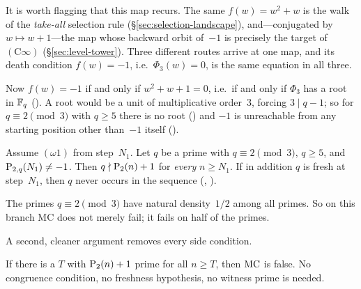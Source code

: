 It is worth flagging that this map recurs.  The same $f(w) = w^2+w$ is the
walk of the \emph{take-all} selection rule (\S\ref{sec:selection-landscape}),
and---conjugated by $w \mapsto w+1$---the map whose backward orbit
of~$-1$ is precisely the target of $(\mathrm{C}\infty)$
(\S\ref{sec:level-tower}).  Three different routes arrive at one map, and
its death condition $f(w) = -1$, i.e.\ $\Phi_3(w) = 0$, is the same
equation in all three.

Now $f(w) = -1$ if and only if $w^2 + w + 1 = 0$, i.e.\ if and only if
$\Phi_3$ has a root in $\mathbb{F}_q$
().
A root would be a unit of multiplicative order~$3$, forcing
$3 \mid q-1$; so for $q \equiv 2 \pmod 3$ with $q \geq 5$ there is no
root () and
$-1$ is unreachable from any starting position other than~$-1$ itself
().

\begin{keyresult}
\begin{theorem}
\label{thm:perpetual-excludes}
Assume $(\omega 1)$ from step~$N_1$.  Let $q$ be a prime with
$q \equiv 2 \pmod 3$, $q \geq 5$, and $\mathrm{P}_{2,q}(N_1) \neq -1$.
Then $q \nmid \mathrm{P}_{2}(n)+1$ for \emph{every} $n \geq N_1$.  If in
addition $q$ is fresh at step~$N_1$, then $q$ never occurs in the
sequence
(,
).
\end{theorem}
\end{keyresult}

\noindent
The primes $q \equiv 2 \pmod 3$ have natural density~$1/2$ among all
primes.  So on this branch MC does not merely fail; it fails on half
of the primes.

A second, cleaner argument removes every side condition.

\begin{keyresult}
\begin{theorem}
\label{thm:bertrand-route}
If there is a $T$ with $\mathrm{P}_{2}(n)+1$ prime for all $n \geq T$, then
$\mathrm{MC}$ is false.  No congruence condition, no freshness hypothesis, no
witness prime is needed.
\end{theorem}
\end{keyresult}

